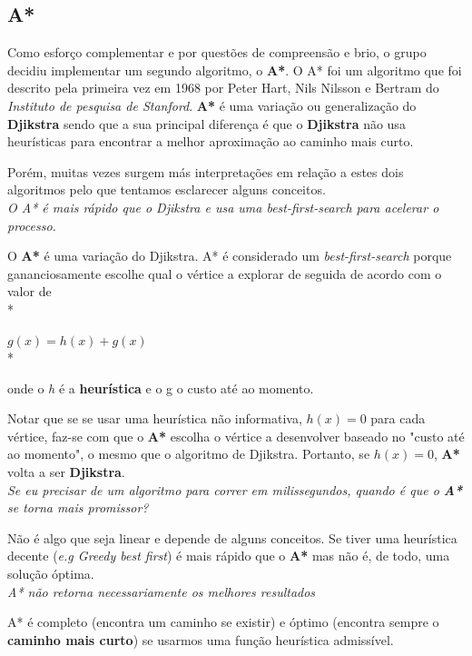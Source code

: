 \documentclass[a4paper]{article}
\begin{document}
\subsection{A*} 


Como esforço complementar e por questões de compreensão e brio, o grupo decidiu implementar um segundo algoritmo, o \textbf{A*}. O A* foi um algoritmo que foi descrito pela primeira vez em 1968 por Peter Hart, Nils Nilsson e Bertram do \textit{Instituto de pesquisa de Stanford}. \textbf{A*} é uma variação ou generalização do \textbf{Djikstra} sendo que a sua principal diferença é que o \textbf{Djikstra} não usa heurísticas para encontrar a melhor aproximação ao caminho mais curto.

Porém, muitas vezes surgem más interpretações em relação a estes dois algoritmos pelo que tentamos esclarecer alguns conceitos.\\

\textit{O A* é mais rápido que o Djikstra e usa uma best-first-search para acelerar o processo.}

O \textbf{A*} é uma variação do Djikstra. A* é considerado um \textit{best-first-search} porque gananciosamente escolhe qual o vértice a explorar de seguida de acordo com o valor de \\*

$g(x) = h(x) + g(x)$\\*


onde o \textit{h} é a \textbf{heurística} e o g o custo até ao momento. 


Notar que se se usar uma heurística não informativa, $h(x) = 0$ para cada vértice, faz-se com que o \textbf{A*} escolha o vértice a desenvolver baseado no "custo até ao momento", o mesmo que o algoritmo de Djikstra. Portanto, se $h(x) = 0$, \textbf{A*} volta a ser \textbf{Djikstra}. \\


\textit{Se eu precisar de um algoritmo para correr em milissegundos, quando é que o \textbf{A*} se torna mais promissor?}

Não é algo que seja linear e depende de alguns conceitos. Se tiver uma heurística decente (\textit{e.g Greedy best first}) é mais rápido que o \textbf{A*} mas não é, de todo, uma solução óptima. \\

\textit{A* não retorna necessariamente os melhores resultados}


A* é completo (encontra um caminho se existir) e óptimo (encontra sempre o \textbf{caminho mais curto}) se usarmos uma função heurística admissível. \\
\end{document}
